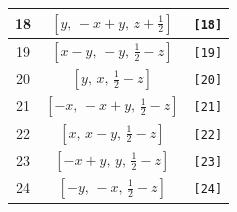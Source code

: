 \documentclass[fleqn,8pt]{jsarticle}
\begin{document}
\begin{longtable}{ccc}
18 & $\left[ y,\, - x + y,\, z + \frac{1}{2} \right]$ & {\tt [18]} \\ \hline
19 & $\left[ x - y,\, - y,\, \frac{1}{2} - z \right]$ & {\tt [19]} \\ \hline
20 & $\left[ y,\, x,\, \frac{1}{2} - z \right]$ & {\tt [20]} \\ \hline
21 & $\left[ - x,\, - x + y,\, \frac{1}{2} - z \right]$ & {\tt [21]} \\ \hline
22 & $\left[ x,\, x - y,\, \frac{1}{2} - z \right]$ & {\tt [22]} \\ \hline
23 & $\left[ - x + y,\, y,\, \frac{1}{2} - z \right]$ & {\tt [23]} \\ \hline
24 & $\left[ - y,\, - x,\, \frac{1}{2} - z \right]$ & {\tt [24]} \\
\end{longtable}
\end{document}
